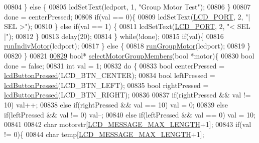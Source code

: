 \begin{DoxyCode}
{{{{{{{{{{{{00804         \} \textcolor{keywordflow}{else} \{
00805             lcdSetText(lcdport, 1, \textcolor{stringliteral}{"Group Motor Test"});
00806         \}
00807         done = centerPressed;
00808         \textcolor{keywordflow}{if}(val == 0)\{
00809             lcdSetText(\hyperlink{lcdmsg_8h_abcf42bd88b3c36193f301ca25b033875}{LCD\_PORT}, 2, \textcolor{stringliteral}{"|      SEL     >"});
00810         \} \textcolor{keywordflow}{else} \textcolor{keywordflow}{if}(val == 1) \{
00811             lcdSetText(\hyperlink{lcdmsg_8h_abcf42bd88b3c36193f301ca25b033875}{LCD\_PORT}, 2, \textcolor{stringliteral}{"<      SEL     |"});
00812         \}
00813         delay(20);
00814     \} \textcolor{keywordflow}{while}(!done);
00815     \textcolor{keywordflow}{if}(val)\{
00816         \hyperlink{lcddiag_8c_ad4df85d8b386f9a60b097fd65cf27e3b}{runIndivMotor}(lcdport);
00817     \} \textcolor{keywordflow}{else} \{
00818         \hyperlink{lcddiag_8c_a61bf99fda231c065d2113f0c67b8d72a}{runGroupMotor}(lcdport);
00819     \}
00820 \}
00821 
\hypertarget{lcddiag_8c_source.tex_l00829}{}\hyperlink{lcddiag_8c_a72f3f96c95c24f67103b2eb30995dccb}{00829} \textcolor{keywordtype}{bool}* \hyperlink{lcddiag_8c_a72f3f96c95c24f67103b2eb30995dccb}{selectMotorGroupMembers}(\textcolor{keywordtype}{bool} *motor)\{
00830     \textcolor{keywordtype}{bool} done = \textcolor{keyword}{false};
00831     \textcolor{keywordtype}{int} val = 1;
00832     \textcolor{keywordflow}{do} \{
00833         \textcolor{keywordtype}{bool} centerPressed = \hyperlink{lcddiag_8h_a74e4c744db49f9b7b645095575e152ad}{lcdButtonPressed}(LCD\_BTN\_CENTER);
00834         \textcolor{keywordtype}{bool} leftPressed = \hyperlink{lcddiag_8h_a74e4c744db49f9b7b645095575e152ad}{lcdButtonPressed}(LCD\_BTN\_LEFT);
00835         \textcolor{keywordtype}{bool} rightPressed = \hyperlink{lcddiag_8h_a74e4c744db49f9b7b645095575e152ad}{lcdButtonPressed}(LCD\_BTN\_RIGHT);
00836 
00837         \textcolor{keywordflow}{if}(rightPressed && val != 10) val++;
00838         \textcolor{keywordflow}{else} \textcolor{keywordflow}{if}(rightPressed && val == 10) val = 0;
00839         \textcolor{keywordflow}{else} \textcolor{keywordflow}{if}(leftPressed && val != 0) val--;
00840         \textcolor{keywordflow}{else} \textcolor{keywordflow}{if}(leftPressed && val == 0) val = 10;
00841 
00842         \textcolor{keywordtype}{char} motorstr[\hyperlink{lcdmsg_8h_abe4c4b70fc6f44ae3680e5b2c68cdd00}{LCD\_MESSAGE\_MAX\_LENGTH}+1];
00843         \textcolor{keywordflow}{if}(val != 0)\{
00844             \textcolor{keywordtype}{char} temp[\hyperlink{lcdmsg_8h_abe4c4b70fc6f44ae3680e5b2c68cdd00}{LCD\_MESSAGE\_MAX\_LENGTH}+1];
}}}}}}}}}}}}
\end{DoxyCode}
